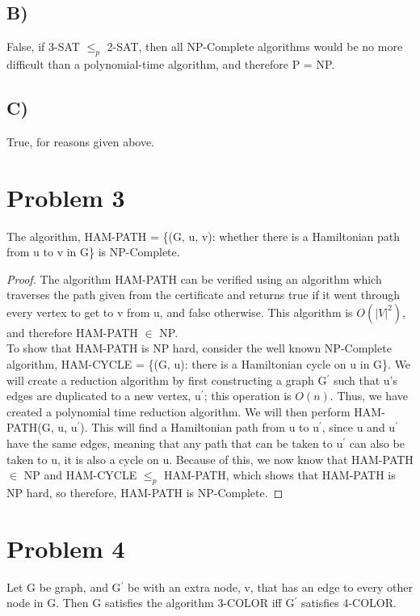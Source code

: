 \documentclass[12pt, letterpaper]{article}
\begin{document}
\subsection*{B)}
False, if 3-SAT $\le_p$ 2-SAT, then all NP-Complete algorithms would be no more difficult than a polynomial-time algorithm, and therefore P = NP.

\subsection*{C)}
True, for reasons given above.

\section*{Problem 3}
The algorithm, HAM-PATH = \{(G, u, v): whether there is a Hamiltonian path from u to v in G\} is NP-Complete.
\begin{proof}
The algorithm HAM-PATH can be verified using an algorithm which traverses the path given from the certificate and returns true if it went through every vertex to get to v from u, and false otherwise. This algorithm is $O(|V|^2)$, and therefore HAM-PATH $\in$ NP.
\vspace{2mm} \\
To show that HAM-PATH is NP hard, consider the well known NP-Complete algorithm, HAM-CYCLE = \{(G, u): there is a Hamiltonian cycle on u in G\}. We will create a reduction algorithm by first constructing a graph G$^\prime$ such that u's edges are duplicated to a new vertex, u$^\prime$; this operation is $O(n)$. Thus, we have created a polynomial time reduction algorithm. We will then perform HAM-PATH(G, u, u$^\prime$). This will find a Hamiltonian path from u to u$^\prime$, since u and u$^\prime$ have the same edges, meaning that any path that can be taken to u$^\prime$ can also be taken to u, it is also a cycle on u. Because of this, we now know that HAM-PATH $\in$ NP and HAM-CYCLE $\le_p$ HAM-PATH, which shows that HAM-PATH is NP hard, so therefore, HAM-PATH is NP-Complete.
\end{proof}

\section*{Problem 4}

Let G be graph, and G$^\prime$ be with an extra node, v, that has an edge to every other node in G. Then G satisfies the algorithm 3-COLOR iff G$^\prime$ satisfies 4-COLOR.
\end{document}
